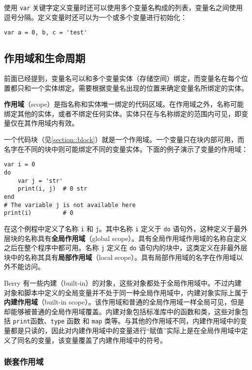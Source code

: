 使用 \texttt{var} 关键字定义变量时还可以使用多个变量名构成的列表，变量名之间使用逗号分隔。定义变量时还可以为一个或多个变量进行初始化：
\begin{lstlisting}[language=berry, numbers=none]
var a = 0, b, c = 'test'
\end{lstlisting}

\subsection{作用域和生命周期} \label{section::scope_life}

前面已经提到，变量名可以和多个变量实体（存储空间）绑定，而变量名在每个位置都只和一个实体绑定。需要根据变量名出现的位置来确定变量名所绑定的实体。

\textbf{作用域}（scope）是指名称和实体唯一绑定的代码区域。在作用域之外，名称可能绑定其他的实体，或者不绑定任何实体。实体只在与名称绑定的范围内可见，即变量仅在其作用域内有效。

一个代码块（见\ref{section::block}）就是一个作用域。一个变量只在块内部可用，而名字在不同的块中则可能绑定不同的变量实体。下面的例子演示了变量的作用域：
\begin{lstlisting}[language=berry]
var i = 0
do
    var j = 'str'
    print(i, j)  # 0 str
end
# The variable j is not available here
print(i)         # 0
\end{lstlisting}
在这个例程中定义了名称 \texttt{i} 和 \texttt{j}。其中名称 \texttt{i} 定义于 \texttt{do} 语句外，这种定义于最外层块的名称具有\textbf{全局作用域}（global scope）。具有全局作用域作用域的名称自定义之后在整个程序中都可用。名称 \texttt{j} 定义在 \texttt{do} 语句内的块中，这类定义在非最外层块中的名称其具有\textbf{局部作用域}（local scope）。具有局部作用域的名字在作用域以外不能访问。

Berry 有一些内建（built-in）的对象，这些对象都处于全局作用域中。不过内建对象和脚本中定义的全局变量并不处于同一种全局作用域中，内建对象实际上属于\textbf{内建作用域}（built-in scope）。该作用域和普通的全局作用域一样全局可见，但是却能够被普通的全局作用域覆盖。内建对象包括标准库中的函数和类，这些对象包括 \texttt{print}函数、\texttt{type} 函数 和 \texttt{map} 类等。与其他的作用域不同，内建作用域中的变量都是只读的，因此对内建作用域中的变量进行``赋值''实际上是在全局作用域中定义了同名的变量，该变量覆盖了内建作用域中的符号。

\subsubsection{嵌套作用域}

